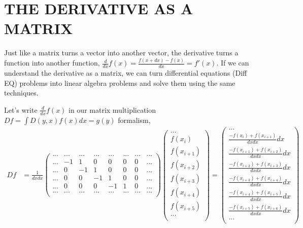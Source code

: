 \documentclass[12pt]{article}
\begin{document}
\section{THE DERIVATIVE AS A MATRIX}
Just like a matrix turns a vector into another vector, the derivative turns a function into another function, $\frac{d}{dx}f(x) = \frac{f(x+dx) - f(x)}{dx} = f'(x)$. If we can understand the derivative as a matrix, we can turn differential equations (Diff EQ) problems into linear algebra problems and solve them using the same techniques. 

Let's write $\frac{d}{dx}f(x)$ in our matrix multiplication $Df = \int D(y,x)f(x)dx = g(y)$ formalism,
\begin{equation}
\begin{split}
Df &= \frac{1}{dxdx} 
\begin{pmatrix}
... & ... & ... & ... & ... & ... & ... & ... \\
... & -1 & 1 & 0 & 0 & 0 & 0 & ...\\
... & 0 & -1 & 1 & 0 & 0 & 0 & ... \\
... & 0 & 0 & -1 & 1 & 0 & 0 & ... \\
... & 0 & 0 & 0 & -1 & 1 & 0 & ... \\
... & ... & ... & ... & ... & ... & ... & ... \\
\end{pmatrix}
\begin{pmatrix}
... \\
f(x_i) \\
f(x_{i+1}) \\
f(x_{i+2}) \\
f(x_{i+3}) \\
f(x_{i+4}) \\
f(x_{i+5}) \\
... \\
\end{pmatrix}
=
\begin{pmatrix}
... \\
\frac{-f(x_i) + f(x_{i+1})}{dxdx}dx \\
\frac{-f(x_{i+1}) + f(x_{i+2})}{dxdx}dx \\
\frac{-f(x_{i+2}) + f(x_{i+3})}{dxdx}dx \\
\frac{-f(x_{i+3}) + f(x_{i+4})}{dxdx}dx \\
\frac{-f(x_{i+4}) + f(x_{i+5})}{dxdx}dx \\
\frac{-f(x_{i+5}) + f(x_{i+6})}{dxdx}dx \\
... \\
\end{pmatrix}\\

\end{split}
\end{equation}
\end{document}
